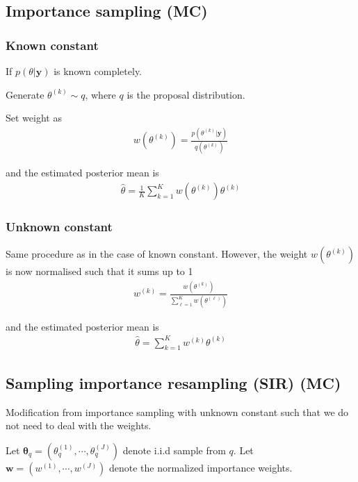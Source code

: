       \subsection{Importance sampling (MC)}

      \subsubsection{Known constant}

      If $p(\theta|\mathbf{y})$ is known completely.

      Generate $\theta^{(k)}\sim q$, where $q$ is the
      proposal distribution.

      Set weight as
      \begin{align*}
          w(\theta^{(k)}) = \frac{p(\theta^{(k)}|\mathbf{y})}
          {q(\theta^{(k)})}
      \end{align*}

      and the estimated posterior mean is
      \begin{align*}
          \hat{\theta} = \frac{1}{K}\sum_{k=1}^K
          w(\theta^{(k)})\theta^{(k)}
      \end{align*}

      \subsubsection{Unknown constant}

      Same procedure as in the case of known constant.
      However, the weight $w(\theta^{(k)})$ is now
      normalised such that it sums up to 1
      \begin{align*}
          w^{(k)} = \frac{w(\theta^{(k)})}
          {\sum_{\ell=1}^K w(\theta^{(\ell)})}
      \end{align*}

      and the estimated posterior mean is
      \begin{align*}
          \hat{\theta} = \sum_{k=1}^K w^{(k)}\theta^{(k)}
      \end{align*}

      \subsection{Sampling importance resampling (SIR) (MC)}

      Modification from importance sampling with unknown
      constant such that we do not need to deal with the
      weights.

      Let $\mathbf{\theta}_q = (\theta_q^{(1)}, \cdots,
      \theta_q^{(J)})$ denote i.i.d sample from $q$. Let
      $\mathbf{w} = (w^{(1)}, \cdots, w^{(J)})$ denote the
      normalized importance weights.

